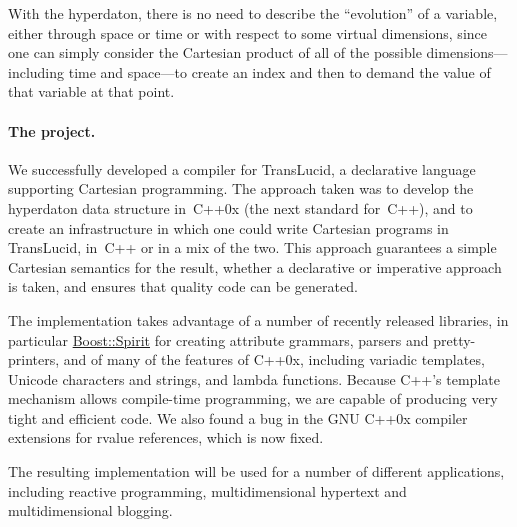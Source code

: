 \documentclass[a4paper]{article}
\begin{document}
\begin{multicols}{2}
With the hyperdaton, there is no need to describe the “evolution” of a
variable, either through space or time or with respect to some virtual
dimensions, since one can simply consider the Cartesian product of all
of the possible dimensions---including time and space---to create an
index and then to demand the value of that variable at that point.

\paragraph{The project.}
We successfully developed a compiler for TransLucid,
a declarative language supporting Cartesian programming.
The approach taken was to develop the hyperdaton data structure
in~C++0x (the next standard for~C++), and to create an infrastructure
in which one could write Cartesian programs in TransLucid, in~C++
or in a mix of the two.  This approach guarantees a simple Cartesian
semantics for the result, whether a declarative or imperative approach
is taken, and ensures that quality code can be generated.

The implementation takes advantage of a number of recently released
libraries, in particular \url{Boost::Spirit} for creating attribute
grammars, parsers and pretty-printers, and of many of the features of
C++0x, including variadic templates, Unicode characters and strings,
and lambda functions.  Because C++'s template mechanism allows compile-time
programming, we are capable of producing very tight and efficient code.
We also found a bug in the GNU C++0x compiler extensions for rvalue 
references, which is now fixed.

The resulting implementation will be used for a number of different
applications, including reactive programming, multidimensional hypertext
and multidimensional blogging.
\end{multicols}
\end{document}
